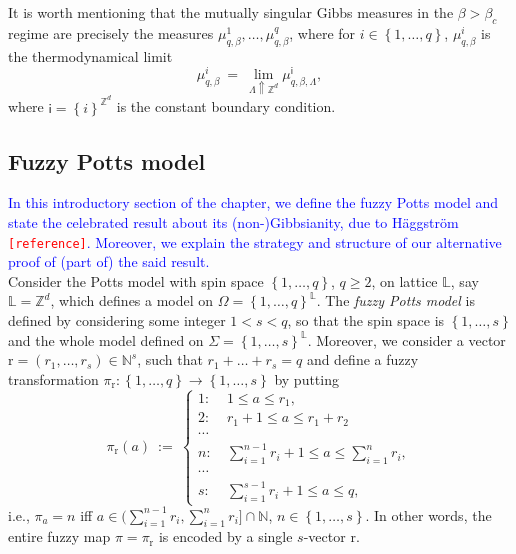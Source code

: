 \documentclass[12pt]{article}
\renewcommand{\L}{\mathbb{L}}
\newcommand{\N}{\mathbb{N}}
\renewcommand{\r}{\mathrm{r}}
\newcommand{\Z}{\mathbb{Z}}
\newcommand{\set}[1]{\left\{#1\right\}}
\newcommand{\ra}{\rightarrow}
\newcommand{\1}{\mathbbm{1}}
\newcommand{\5}{\vspace{0.5cm}}
\theoremstyle{definition}
\begin{document}
It is worth mentioning that the mutually singular Gibbs measures in the $\beta>\beta_c$ regime are precisely the measures $\mu_{q,\beta}^1,\ldots,\mu_{q,\beta}^q$, where for $i\in\set{1,\ldots,q}$, $\mu_{q,\beta}^i$ is the thermodynamical limit
$$\mu_{q,\beta}^i ~=~ \lim_{\Lambda\Uparrow\Z^d}\mu_{q,\beta,\Lambda}^{\mathsf{i}},$$
where $\mathsf{i}=\set{i}^{\Z^d}$ is the constant boundary condition.


\subsection{Fuzzy Potts model}

\textcolor{blue}{In this introductory section of the chapter, we define the fuzzy Potts model and state the celebrated result about its (non-)Gibbsianity, due to H\"aggstr\"om \textcolor{red}{\texttt{[reference]}}. Moreover, we explain the strategy and structure of our alternative proof of (part of) the said result.} \\

Consider the Potts model with spin space $\set{1,\ldots,q}$, $q\geq 2$, on lattice $\L$, say $\L=\Z^d$, which defines a model on $\Omega=\set{1,\ldots,q}^\L$. The \textit{fuzzy Potts model} is defined by considering some integer $1<s<q$, so that the spin space is $\set{1,\ldots,s}$ and the whole model defined on $\Sigma=\set{1,\ldots,s}^\L$. Moreover, we consider a vector $\r=(r_1,\ldots,r_s)\in\N^s$, such that $r_1+\ldots+r_s=q$ and define a fuzzy transformation $\pi_\r:\set{1,\ldots,q}\ra\set{1,\ldots,s}$ by putting 
$$\pi_\r(a) ~:=~ \begin{cases}
1: ~&1\leq a\leq r_1,\\
2: ~&r_1+1\leq a\leq r_1+r_2 \\
\cdots \\
n: ~&\sum_{i=1}^{n-1} r_i + 1\leq a\leq \sum_{i=1}^n r_i,\\
\cdots \\
s: ~&\sum_{i=1}^{s-1}r_i + 1\leq a\leq q,
\end{cases}$$
i.e., $\pi_a=n$ iff $a\in(\sum_{i=1}^{n-1}r_i,\sum_{i=1}^n r_i]\cap \N$, $n\in\set{1,\ldots,s}$. In other words, the entire fuzzy map $\pi=\pi_\r$ is encoded by a single $s$-vector $\r$. \\
\end{document}
